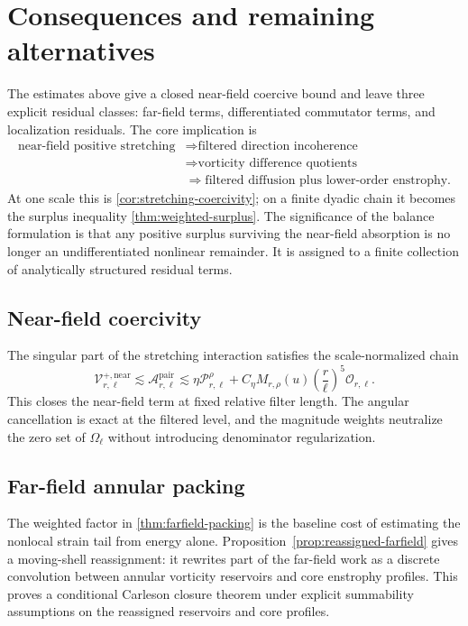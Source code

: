 \documentclass[11pt]{article}
\numberwithin{equation}{section}
\theoremstyle{plain}
\theoremstyle{definition}
\theoremstyle{remark}
\begin{document}
\section{Consequences and remaining alternatives}\label{sec:discussion}

The estimates above give a closed near-field coercive bound and leave three explicit residual classes: far-field terms, differentiated commutator terms, and localization residuals.  The core implication is
\[
\begin{aligned}
\text{near-field positive stretching}
&\Longrightarrow \text{filtered direction incoherence}\\
&\Longrightarrow \text{vorticity difference quotients}\\
&\Longrightarrow \text{filtered diffusion plus lower-order enstrophy}.
\end{aligned}
\]
At one scale this is \cref{cor:stretching-coercivity}; on a finite dyadic chain it becomes the surplus inequality \cref{thm:weighted-surplus}.  The significance of the balance formulation is that any positive surplus surviving the near-field absorption is no longer an undifferentiated nonlinear remainder.  It is assigned to a finite collection of analytically structured residual terms.

\subsection{Near-field coercivity}

The singular part of the stretching interaction satisfies the scale-normalized chain
\[
\mathcal V^{+,\mathrm{near}}_{r,\ell}
\lesssim
\mathcal A^{\mathrm{pair}}_{r,\ell}
\lesssim
\eta\mathcal P^\rho_{r,\ell}
+
C_\eta M_{r,\rho}(u)
\left(\frac r\ell\right)^5\mathcal O_{r,\ell}.
\]
This closes the near-field term at fixed relative filter length.  The angular cancellation is exact at the filtered level, and the magnitude weights neutralize the zero set of $\Omega_\ell$ without introducing denominator regularization.

\subsection{Far-field annular packing}

The weighted factor in \cref{thm:farfield-packing} is the baseline cost of estimating the nonlocal strain tail from energy alone.  Proposition~\ref{prop:reassigned-farfield} gives a moving-shell reassignment: it rewrites part of the far-field work as a discrete convolution between annular vorticity reservoirs and core enstrophy profiles.  This proves a conditional Carleson closure theorem under explicit summability assumptions on the reassigned reservoirs and core profiles.
\end{document}
